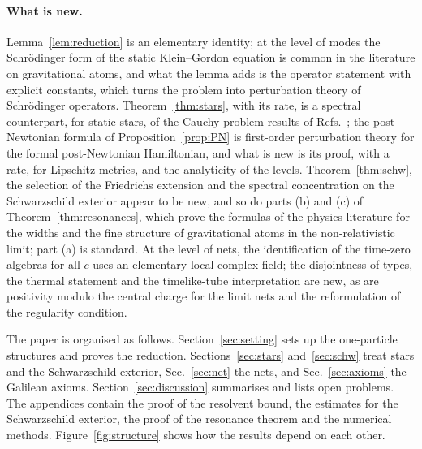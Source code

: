 \documentclass[%
 aip,
 jmp,
 amsmath,amssymb,
 reprint, onecolumn
]{revtex4-1}
\theoremstyle{definition}
\theoremstyle{remark}
\begin{document}
\paragraph{What is new.} Lemma~\ref{lem:reduction} is an elementary
identity; at the level of modes the Schr\"odinger form of the static
Klein--Gordon equation is common in the literature on gravitational
atoms, and what the lemma adds is the operator statement with explicit
constants, which turns the problem into perturbation theory of
Schr\"odinger operators. Theorem~\ref{thm:stars}, with its rate, is a
spectral counterpart, for static stars, of the Cauchy-problem results of
Refs.~;
the post-Newtonian formula of Proposition~\ref{prop:PN} is first-order
perturbation theory for the formal post-Newtonian Hamiltonian, and what
is new is its proof, with a rate, for Lipschitz metrics, and the
analyticity of the levels. Theorem~\ref{thm:schw}, the selection of the
Friedrichs extension and the spectral concentration on the Schwarzschild
exterior appear to be new, and so do parts (b) and (c) of
Theorem~\ref{thm:resonances}, which prove the formulas of the physics
literature for the widths and the fine structure of gravitational atoms
in the non-relativistic limit; part (a) is standard. At the level of nets, the
identification of the time-zero algebras for all $c$ uses an elementary
local complex field; the disjointness of types, the thermal statement and the timelike-tube
interpretation are new, as are positivity modulo the central charge for
the limit nets and the reformulation of the regularity condition.

The paper is organised as follows. Section~\ref{sec:setting} sets up the
one-particle structures and proves the reduction. Sections~\ref{sec:stars}
and~\ref{sec:schw} treat stars and the Schwarzschild exterior,
Sec.~\ref{sec:net} the nets, and Sec.~\ref{sec:axioms} the Galilean
axioms. Section~\ref{sec:discussion} summarises and lists open problems.
The appendices contain the proof of the resolvent bound, the estimates
for the Schwarzschild exterior, the proof of the resonance theorem and
the numerical methods. Figure~\ref{fig:structure} shows how the results depend on each other.
\end{document}
